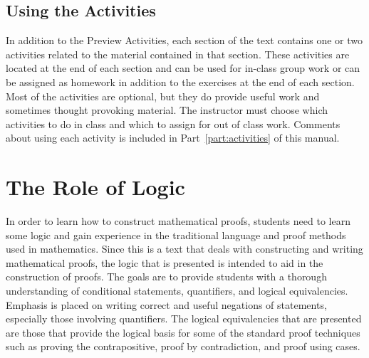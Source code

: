 
\subsection*{Using the Activities}

In addition to the Preview Activities, each section of the text contains one or two activities related to the material contained in that section.  These activities are located at the end of each section and can be used for in-class group work or can be assigned as homework in addition to the exercises at the end of each section.  Most of the activities are optional, but they do provide useful work and sometimes thought provoking material.  The instructor must choose which activities to do in class and which to assign for out of class work.  Comments about using each activity is included in Part~\ref{part:activities} of this manual.
\hbreak



\section*{The Role of Logic}

In order to learn how to construct mathematical proofs, students need to learn some logic and gain experience in the traditional language and proof methods used in mathematics.  Since this is a text that deals with constructing and writing mathematical proofs, the logic that is presented is intended to aid in the construction of proofs.  The goals are to provide students with a thorough understanding of conditional statements, quantifiers, and logical equivalencies.  Emphasis is placed on writing correct and useful negations of statements, especially those involving quantifiers.  The logical equivalencies that are presented are those that provide the logical basis for some of the standard proof techniques such as proving the contrapositive, proof by contradiction, and proof using cases.
\hbreak

